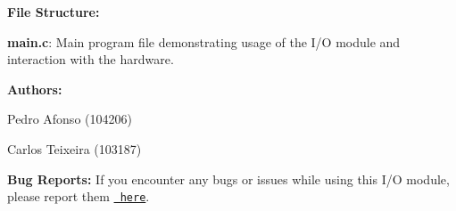 {\bfseries{File Structure\+:}}
\begin{DoxyItemize}
\item {\bfseries{main.\+c}}\+: Main program file demonstrating usage of the I/O module and interaction with the hardware.
\end{DoxyItemize}

{\bfseries{Authors\+:}}
\begin{DoxyItemize}
\item Pedro Afonso (104206)
\item Carlos Teixeira (103187)
\end{DoxyItemize}

{\bfseries{Bug Reports\+:}} If you encounter any bugs or issues while using this I/O module, please report them \href{https://github.com/pisko19/SETR/issues}{\texttt{ here}}. 